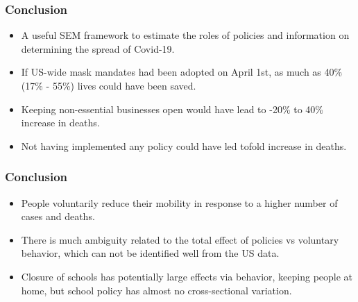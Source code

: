 \documentclass{beamer}
\begin{document}
\begin{frame}
  \frametitle{Conclusion }

\begin{itemize}
\item  A useful SEM framework to estimate the roles of policies and information on determining the spread of Covid-19. \smallskip
 
\item  If US-wide mask mandates had been adopted on April 1st, as much as 40\% (17\% - 55\%) lives could have been saved.\smallskip

\item Keeping non-essential businesses open would have lead to  -20\% to 40\% increase in deaths.\smallskip

\item Not having implemented any policy could have led to\qquad  [0,  10] fold increase in deaths.  %


\end{itemize}
 

\end{frame}



\begin{frame}
  \frametitle{Conclusion}
  
\begin{itemize}
  
\item People voluntarily reduce their mobility in response to a higher number of cases and deaths.\smallskip

 
\item There is much ambiguity related to the total effect of policies vs voluntary behavior, which can not be identified well from the US data. \smallskip

\item Closure of schools has potentially large effects via behavior, keeping people at home, but school policy has almost no cross-sectional variation.\smallskip %


  
\end{itemize}
  
\end{frame}
\end{document}
